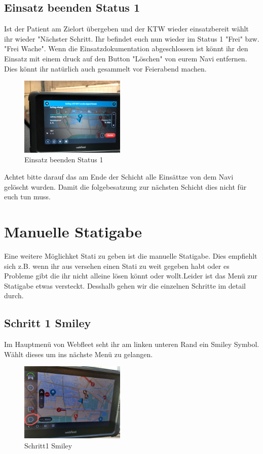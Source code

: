 \documentclass[a4paper,12pt]{scrartcl}
\begin{document}
    \subsection{Einsatz beenden Status 1}
    Ist der Patient am Zielort übergeben und der KTW wieder einsatzbereit wählt ihr wieder "Nächster Schritt.
    Ihr befindet euch nun wieder im Status 1 "Frei" bzw. "Frei Wache". Wenn die Einsatzdokumentation abgeschlossen ist 
    könnt ihr den Einsatz mit einem druck auf den Button "Löschen" von eurem Navi entfernen. Dies könnt ihr natürlich 
    auch gesammelt vor Feierabend machen. 
    \begin{figure}[h]
        \begin{center}
            \includegraphics[width=5cm]{bilder/beenden.jpg}
            \caption{Einsatz beenden Status 1}
            \label{Beenden}
        \end{center} 
    \end{figure}
    \newline Achtet bitte darauf das am Ende der Schicht alle Einsättze von dem Navi gelöscht wurden. Damit die folgebesatzung
    zur nächsten Schicht dies nicht für euch tun muss.

    \newpage
    \section{Manuelle Statigabe}
    Eine weitere Möglichket Stati zu geben ist die manuelle Statigabe. Dies empfiehlt sich z.B. wenn ihr
    aus versehen einen Stati zu weit gegeben habt oder es Probleme gibt die ihr nicht alleine lösen 
    könnt oder wollt.Leider ist das Menü zur Statigabe etwas versteckt.
    Desshalb gehen wir die einzelnen Schritte im detail durch.
    

    \subsection{Schritt 1 Smiley}
    Im Hauptmenü von Webfleet seht ihr am linken unteren Rand ein Smiley Symbol. Wählt dieses um ins nächste
    Menü zu gelangen.
    \begin{figure}[h]
        \begin{center}
            \includegraphics[width=5cm]{bilder/Schritt1.jpg}
            \caption{Schritt1 Smiley}
            \label{Smiley}
        \end{center} 
    \end{figure}
\end{document}
